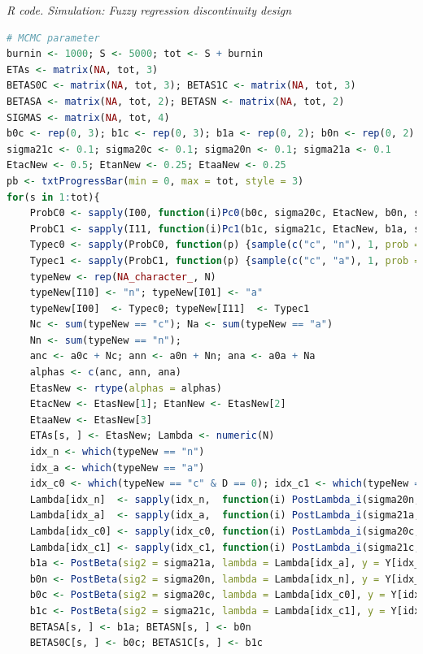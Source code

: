 \begin{tcolorbox}[enhanced,width=4.67in,center upper,
	fontupper=\large\bfseries,drop shadow southwest,sharp corners]
	\textit{R code. Simulation: Fuzzy regression discontinuity design}
	\begin{VF}
		\begin{lstlisting}[language=R]	
# MCMC parameter
burnin <- 1000; S <- 5000; tot <- S + burnin 
ETAs <- matrix(NA, tot, 3)
BETAS0C <- matrix(NA, tot, 3); BETAS1C <- matrix(NA, tot, 3)
BETASA <- matrix(NA, tot, 2); BETASN <- matrix(NA, tot, 2)
SIGMAS <- matrix(NA, tot, 4)
b0c <- rep(0, 3); b1c <- rep(0, 3); b1a <- rep(0, 2); b0n <- rep(0, 2)
sigma21c <- 0.1; sigma20c <- 0.1; sigma20n <- 0.1; sigma21a <- 0.1
EtacNew <- 0.5; EtanNew <- 0.25; EtaaNew <- 0.25
pb <- txtProgressBar(min = 0, max = tot, style = 3)
for(s in 1:tot){
	ProbC0 <- sapply(I00, function(i)Pc0(b0c, sigma20c, EtacNew, b0n, sigma20n, EtanNew, i = i))
	ProbC1 <- sapply(I11, function(i)Pc1(b1c, sigma21c, EtacNew, b1a, sigma21a, EtaaNew, i = i))
	Typec0 <- sapply(ProbC0, function(p) {sample(c("c", "n"), 1, prob = c(p, 1-p))})
	Typec1 <- sapply(ProbC1, function(p) {sample(c("c", "a"), 1, prob = c(p, 1-p))})
	typeNew <- rep(NA_character_, N)
	typeNew[I10] <- "n"; typeNew[I01] <- "a"
	typeNew[I00]  <- Typec0; typeNew[I11]  <- Typec1
	Nc <- sum(typeNew == "c"); Na <- sum(typeNew == "a")
	Nn <- sum(typeNew == "n");
	anc <- a0c + Nc; ann <- a0n + Nn; ana <- a0a + Na
	alphas <- c(anc, ann, ana)
	EtasNew <- rtype(alphas = alphas)
	EtacNew <- EtasNew[1]; EtanNew <- EtasNew[2]
	EtaaNew <- EtasNew[3]
	ETAs[s, ] <- EtasNew; Lambda <- numeric(N)
	idx_n <- which(typeNew == "n")
	idx_a <- which(typeNew == "a")
	idx_c0 <- which(typeNew == "c" & D == 0); idx_c1 <- which(typeNew == "c" & D == 1)
	Lambda[idx_n]  <- sapply(idx_n,  function(i) PostLambda_i(sigma20n, b0n, Y[i],  W[i, ], v))
	Lambda[idx_a]  <- sapply(idx_a,  function(i) PostLambda_i(sigma21a, b1a, Y[i],  W[i, ], v))
	Lambda[idx_c0] <- sapply(idx_c0, function(i) PostLambda_i(sigma20c, b0c, Y[i], Wc[i, ], v))
	Lambda[idx_c1] <- sapply(idx_c1, function(i) PostLambda_i(sigma21c, b1c, Y[i], Wc[i, ], v))
	b1a <- PostBeta(sig2 = sigma21a, lambda = Lambda[idx_a], y = Y[idx_a], H = W[idx_a,])
	b0n <- PostBeta(sig2 = sigma20n, lambda = Lambda[idx_n], y = Y[idx_n], H = W[idx_n,])
	b0c <- PostBeta(sig2 = sigma20c, lambda = Lambda[idx_c0], y = Y[idx_c0], H = Wc[idx_c0,])
	b1c <- PostBeta(sig2 = sigma21c, lambda = Lambda[idx_c1], y = Y[idx_c1], H = Wc[idx_c1,])
	BETASA[s, ] <- b1a; BETASN[s, ] <- b0n
	BETAS0C[s, ] <- b0c; BETAS1C[s, ] <- b1c 
\end{lstlisting}
	\end{VF}
\end{tcolorbox}  

